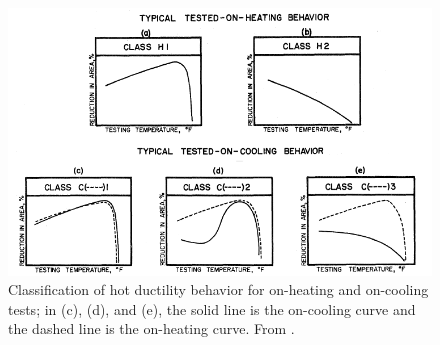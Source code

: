 \begin{figure}[h]
\centering
\includegraphics[width=6in]{figures/nippes-criteria.png}
\caption{Classification of hot ductility behavior for on-heating and on-cooling tests; in (c), (d), and (e), the solid line is the on-cooling curve and the dashed line is the on-heating curve.  From \citet[Fig.~66]{nippes_further_1957}.}
\label{fig:nippes-criteria}
\end{figure}

